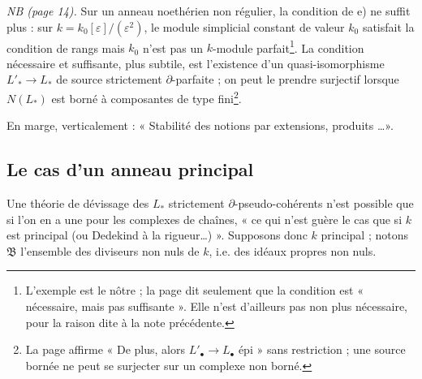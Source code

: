\documentclass[11pt,a4paper]{article}
\begin{document}
\emph{NB (page 14).} Sur un anneau noethérien non régulier, la condition de
e) ne suffit plus : sur $k = k_{0}[\varepsilon]/(\varepsilon^{2})$, le
module simplicial constant de valeur $k_{0}$ satisfait la condition de rangs
mais $k_{0}$ n'est pas un $k$-module parfait\footnote{L'exemple est le nôtre ;
la page dit seulement que la condition est « nécessaire, mais pas suffisante ».
Elle n'est d'ailleurs pas non plus nécessaire, pour la raison dite à la
note précédente.}. La condition nécessaire et suffisante, plus subtile, est
l'existence d'un quasi-isomorphisme $L'_{*} \to L_{*}$ de source strictement
$\partial$-parfaite ; on peut le prendre surjectif lorsque $N(L_{*})$ est
borné à composantes de type fini\footnote{La page affirme « De plus, alors
$L'_{\bullet} \to L_{\bullet}$ épi » sans restriction ; une source bornée ne
peut se surjecter sur un complexe non borné.}.

En marge, verticalement : « Stabilité des notions par extensions, produits
\ldots ».

\subsection*{Le cas d'un anneau principal}

Une théorie de dévissage des $L_{*}$ strictement $\partial$-pseudo-cohérents
n'est possible que si l'on en a une pour les complexes de chaînes, « ce qui
n'est guère le cas que si $k$ est principal (ou Dedekind à la
rigueur\ldots) ». Supposons donc $k$ principal ; notons $\mathfrak{B}$
l'ensemble des diviseurs non nuls de $k$, i.e. des idéaux propres non nuls.
\end{document}
